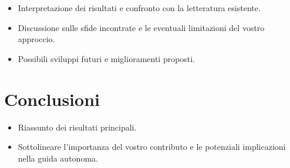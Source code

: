 \documentclass[conference]{IEEEtran}
\begin{document}
\begin{itemize}
    \item Interpretazione dei risultati e confronto con la letteratura esistente.

    \item Discussione sulle sfide incontrate e le eventuali limitazioni del vostro approccio.

    \item Possibili sviluppi futuri e miglioramenti proposti.

\end{itemize}

\section{Conclusioni}

\begin{itemize}
    \item Riassunto dei risultati principali.

    \item Sottolineare l'importanza del vostro contributo e le potenziali implicazioni nella guida autonoma.

\end{itemize}



\end{document}
